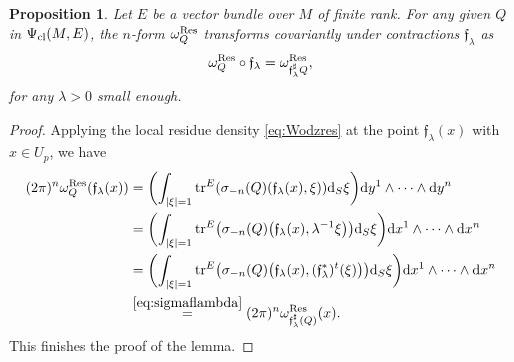 \documentclass[10pt,a4paper]{amsart}
\numberwithin{equation}{section}
\newtheorem{prop}[thm]{Proposition}
\theoremstyle{definition}
\def \bui#1#2{\mathrel{\mathop{\kern 0pt#1}\limits^{#2}}}
\begin{document}
\begin{prop} \label{prop:flambdasharpA} Let $E$ be a vector bundle over $M$ of finite rank. For any given $Q$ in $\Psi_{\rm cl}(M,E)$, the $n$-form $\omega^{\rm Res}_Q $ transforms covariantly under contractions ${\mathfrak f}_\lambda$ as
\begin{equation*}
\omega_Q^{\rm Res}\circ{\mathfrak f}_\lambda =\omega^{\rm Res}_{{\mathfrak f}_\lambda^\sharp Q},
\end{equation*}
for any $\lambda>0$ small enough.
\end{prop}
 \begin{proof} Applying the local residue density \eqref{eq:Wodzres} at the point $\mathfrak{f}_\lambda(x)$ {with $x\in U_p$}, we have
\begin{align*} 	
(2\pi)^n\omega_Q^{{ {\rm Res}}}({\mathfrak f}_{ \lambda}(x))
&= \biggl( \int_{\vert \xi\vert=1} {\rm tr}^E(\sigma_{ {-n}}({ Q})({ { {\mathfrak f}}_{ \lambda}(x)}, \xi)) {\rm d}_S\xi\biggr) {\rm d}{ y^1}\wedge \dots \wedge {\rm d}{y^n} \\
&= \biggl( \int_{\vert \xi\vert=1}{\rm tr}^E\bigl( \sigma_{ {-n}}({Q})\bigl({ { {\mathfrak f}}_{ \lambda}(x)},{ \lambda}^{ -1} \xi\bigr)\bigr) {\rm d}_S\xi\biggr) {\rm d}{ x}^1\wedge \dots \wedge {\rm d}{x}^n \\
&= \biggl( \int_{\vert \xi\vert=1} {\rm tr}^E\bigl(\sigma_{ {-n}}({ Q})\bigl({ { {\mathfrak f}}_{ \lambda}(x)}, ({\mathfrak f}_{ \lambda}^*)^t (\xi)\bigr)\bigr) {\rm d}_S\xi\biggr) {\rm d}{ x}^1\wedge \dots \wedge {\rm d}{x}^n \\
&\bui{=}{\eqref{eq:sigmaflambda}} (2\pi)^n \omega^{ {\rm Res}}_{{ {\mathfrak f}}_{ \lambda}^\sharp (Q)}(x).
\end{align*}
This finishes the proof of the lemma.
\end{proof}
\end{document}

